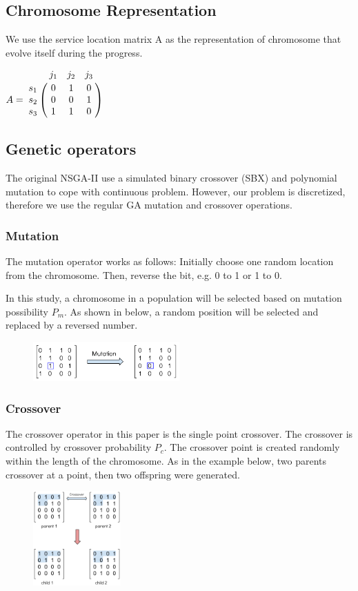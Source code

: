\documentclass{llncs}
\let\bbordermatrix\bordermatrix
\begin{document}
\subsection{Chromosome Representation}
We use the service location matrix A as the representation of chromosome that evolve itself during the progress.
\begin{center}
$
A = \bbordermatrix{~ & j_{1} & j_{2} & j_{3}\cr
					s_{1}	&0 &1 &0	\cr
					s_{2}	&0  &0 &1	\cr
					s_{3}	&1 &1 &0	\cr} 
$
\end{center}

\subsection{Genetic operators}
\label{sec:operators}
 The original NSGA-II use a simulated 
binary crossover (SBX) \cite{930314} and polynomial mutation \cite{Raghuwanshi04} to cope with continuous problem. 
However, our problem is discretized, therefore we use the regular GA mutation and crossover operations.


\subsubsection{Mutation}
The mutation operator works as follows: Initially choose one random location from the chromosome. 
Then, reverse the bit, e.g. 0 to 1 or 1 to 0. 

In this study, a chromosome in a population will be selected based on mutation possibility $P_{m}$. 
As shown in below, a random position will be selected and replaced by a reversed number.
\begin{figure}[ht]
\centering
	\includegraphics[width=0.5\textwidth]{pics/mutation.png}
\caption{}
\label{graph1}
\end{figure}
\subsubsection{Crossover}
The crossover operator in this paper is the single point crossover. 
The crossover is controlled by crossover probability $P_{c}$. 
The crossover point is created randomly within the length of the chromosome. 
As in the example below, two parents crossover at a point, then two offspring were generated.
\begin{figure}[ht]
\centering
	\includegraphics[width=0.3\textwidth]{pics/crossover.png}
\caption{}
\label{graph2}
\end{figure}
\end{document}
